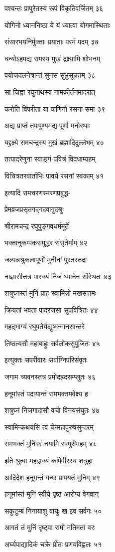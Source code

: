 पश्यन्तः प्रापुरेतस्य रूपं विकृतिवर्जितम् ३६

योगिनो ध्याननिष्ठा ये यं ध्यात्वा योगमास्थिताः

संसारभयनिर्मुक्ताः प्रयाताः परमं पदम् ३७

धन्योऽहमद्य रामस्य मुखं द्रक्ष्यामि शोभनम्

पयोजदलनेत्रान्तं सुनसं सुभ्रुसून्नतम् ३८

सा जिह्वा रघुनाथस्य नामकीर्तनमादरात्

करोति विपरीता या फणिनो रसना समा ३९

अद्य प्राप्तं तपःपुण्यमद्य पूर्णा मनोरथाः

यद्द्रक्ष्ये रामचन्द्रस्य मुखं ब्रह्मादिदुर्ल्लभम् ४०

तत्पादरेणुना स्वाङ्गं पवित्रं विदधाम्यहम्

विचित्रतरवार्ताभिः पावये रसनां स्वकाम् ४१

इत्यादि रामचरणस्मरणप्रबुद्ध-

प्रेमव्रजप्रसृतगद्गदवागुदश्रुः

श्रीरामचन्द्र रघुपुङ्गवधर्ममूर्ते

भक्तानुकम्पकसमुद्धर संसृतेर्माम् ४२

जल्पन्नश्रुकलापूर्णो मुनीनां पुरतस्तदा

नाज्ञासीत्तत्र पारक्यं निजं ध्यानेन संस्थितः ४३

शत्रुघ्नस्तं मुनिं प्राह स्वामिन्नो मखसत्तमः

क्रियतां भवता पादरजसा सुपवित्रितः ४४

महद्भाग्यं रघुपतेर्यद्युष्मन्मानसान्तरे

तिष्ठत्यसौ महाबाहुः सर्वलोकसुपूजितः ४५

इत्युक्तः सपरीवारः सर्वाग्निपरिसंवृतः

जगाम च्यवनस्तत्र प्रमोदह्रदसम्प्लुतः ४६

हनूमांस्तं पदायान्तं रामभक्तमवेक्ष्य ह

शत्रुघ्नं निजगादासौ वचो विनयसंयुतः ४७

स्वामिन्कथयसि त्वं चेन्महापुरुषसुन्दरम्

रामभक्तं मुनिवरं नयामि स्वपुरीमहम् ४८

इति श्रुत्वा महद्वाक्यं कपिवीरस्य शत्रुहा

आदिदेश हनूमन्तं गच्छ प्रापयतं मुनिम् ४९

हनूमांस्तं मुनिं स्वीये पृष्ठ आरोप्य वेगवान्

सकुटुम्बं निनायाशु वायुः ख इव सर्वगः ५०

आगतं तं मुनिं दृष्ट्वा रामो मतिमतां वरः

अर्घ्यपाद्यादिकं चक्रे प्रीतः प्रणयविह्वलः ५१

